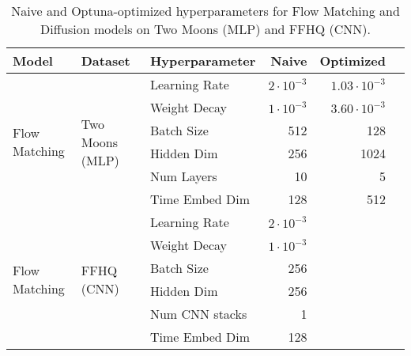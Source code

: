 \documentclass{article}
\begin{document}
\begin{table}[H]
	\centering
	\caption{Naive and Optuna-optimized hyperparameters for Flow Matching and Diffusion models on Two Moons (MLP) and FFHQ (CNN).}
	\begin{tabular}{lllrrr}
		\toprule
		\textbf{Model}                 & \textbf{Dataset}                 & \textbf{Hyperparameter} & \textbf{Naive}     & \textbf{Optimized}  \\
		\midrule
		\multirow{6}{*}{Flow Matching} & \multirow{6}{*}{Two Moons (MLP)}
		                               & Learning Rate                    & $2\cdot10^{-3}$         & $1.03\cdot10^{-3}$                       \\
		                               &                                  & Weight Decay            & $1 \cdot 10^{-3}$  & $3.60\cdot 10^{-3}$ \\
		                               &                                  & Batch Size              & 512                & 128                 \\
		                               &                                  & Hidden Dim              & 256                & 1024                \\
		                               &                                  & Num Layers              & 10                 & 5                   \\
		                               &                                  & Time Embed Dim          & 128                & 512                 \\
		\midrule
		\multirow{6}{*}{Flow Matching} & \multirow{6}{*}{FFHQ (CNN)}
		                               & Learning Rate                    & $2\cdot10^{-3}$         &                                          \\
		                               &                                  & Weight Decay            & $1\cdot10^{-3}$    &                     \\
		                               &                                  & Batch Size              & 256                &                     \\
		                               &                                  & Hidden Dim              & 256                &                     \\
		                               &                                  & Num CNN stacks          & 1                  &                     \\
		                               &                                  & Time Embed Dim          & 128                &                     \\

\end{tabular}
\end{table}
\end{document}
